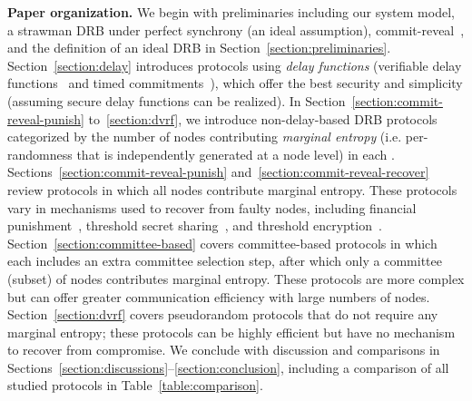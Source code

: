 \textbf{Paper organization.} We begin with preliminaries including our system model, a strawman DRB under perfect synchrony (an ideal assumption), commit-reveal~\cite{blum1983coin}, and the definition of an ideal DRB in Section~\ref{section:preliminaries}. Section~\ref{section:delay} introduces protocols using \textit{delay functions} (verifiable delay functions~\cite{boneh2018verifiable} and timed commitments~\cite{boneh2000timed}), which offer the best security and simplicity (assuming secure delay functions can be realized). In Section~\ref{section:commit-reveal-punish} to~\ref{section:dvrf}, we introduce non-delay-based DRB protocols categorized by the number of nodes contributing \textit{marginal entropy} (i.e. per-\epoch randomness that is independently generated at a node level) in each \epoch. Sections~\ref{section:commit-reveal-punish} and~\ref{section:commit-reveal-recover} review protocols in which all nodes contribute marginal entropy. These protocols vary in mechanisms used to recover from faulty nodes, including financial punishment~\cite{youcai2017randao, david2020economically}, threshold secret sharing~\cite{schoenmakers1999simple, cascudo2017scrape}, and threshold encryption~\cite{desmedt1990Threshold}. Section~\ref{section:committee-based} covers committee-based protocols in which each \epoch includes an extra committee selection step, after which only a committee (subset) of nodes contributes marginal entropy. These protocols are more complex but can offer greater communication efficiency with large numbers of nodes. Section~\ref{section:dvrf} covers pseudorandom protocols that do not require any marginal entropy; these protocols can be highly efficient but have no mechanism to recover from compromise. We conclude with discussion and comparisons in Sections~\ref{section:discussions}--\ref{section:conclusion}, including a comparison of all studied protocols in Table~\ref{table:comparison}.

